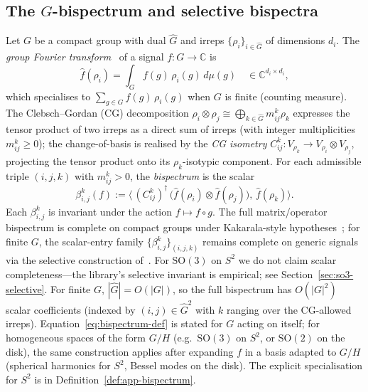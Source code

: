 \documentclass{article}
\theoremstyle{definition}
\theoremstyle{remark}
\newcommand{\C}{\mathbb{C}}
\newcommand{\SO}{\mathrm{SO}}
\theoremstyle{definition}
\begin{document}
\subsection{The $G$-bispectrum and selective bispectra}

Let $G$ be a compact group with dual $\hat{G}$ and irreps
$\{\rho_i\}_{i \in \hat{G}}$ of dimensions $d_i$. The \emph{group Fourier
transform}~\citep{diaconis1990fourier} of a signal $f : G \to \C$ is
\begin{equation}\label{eq:fourier}
  \hat{f}(\rho_i)
  = \int_G f(g)\, \rho_i(g)\, d\mu(g)
  \quad\in\C^{d_i \times d_i},
\end{equation}
which specialises to $\sum_{g \in G} f(g)\, \rho_i(g)$ when $G$ is finite
(counting measure). The Clebsch--Gordan (CG) decomposition
$\rho_i \otimes \rho_j \cong \bigoplus_{k \in \hat{G}} m_{ij}^k \rho_k$
expresses the tensor product of two irreps as a direct sum of irreps
(with integer multiplicities $m_{ij}^k \ge 0$); the change-of-basis is
realised by the \emph{CG isometry}
$C_{ij}^k : V_{\rho_k} \to V_{\rho_i} \otimes V_{\rho_j}$, projecting the
tensor product onto its $\rho_k$-isotypic component. For each admissible
triple $(i, j, k)$ with $m_{ij}^k > 0$, the \emph{bispectrum} is the
scalar
\begin{equation}
  \label{eq:bispectrum-def}
  \beta_{i,j}^{k}(f)
  := \bigl\langle\, (C_{ij}^k)^{\dagger}\,
        \bigl(\hat{f}(\rho_i) \otimes \hat{f}(\rho_j)\bigr),\,
        \hat{f}(\rho_k) \bigr\rangle.
\end{equation}
Each $\beta_{i,j}^{k}$ is invariant under the action $f \mapsto f \circ g$.
The full matrix/operator bispectrum is complete on compact
groups under Kakarala-style
hypotheses~\citep{kakarala1992triple,kakarala2012bispectrum}; for
finite $G$, the scalar-entry family
$\{\beta_{i,j}^{k}\}_{(i,j,k)}$ remains complete on generic signals
via the selective construction of~\citet{mataigne2024selective}.
For $\SO(3)$ on $S^2$ we do not claim scalar
completeness---the library's selective invariant is empirical; see
Section~\ref{sec:so3-selective}. For finite $G$,
$|\hat G| = O(|G|)$, so the full bispectrum has $O(|G|^2)$
scalar coefficients (indexed by $(i,j) \in \hat{G}^2$
with $k$ ranging over the CG-allowed irreps).
Equation~\eqref{eq:bispectrum-def} is stated for $G$ acting on itself;
for homogeneous spaces of the form $G/H$ (e.g.\ $\SO(3)$ on $S^2$, or
$\SO(2)$ on the disk), the same construction applies after expanding $f$
in a basis adapted to $G/H$ (spherical harmonics for $S^2$, Bessel modes
on the disk). The explicit specialisation for $S^2$ is in
Definition~\ref{def:app-bispectrum}.
\end{document}
